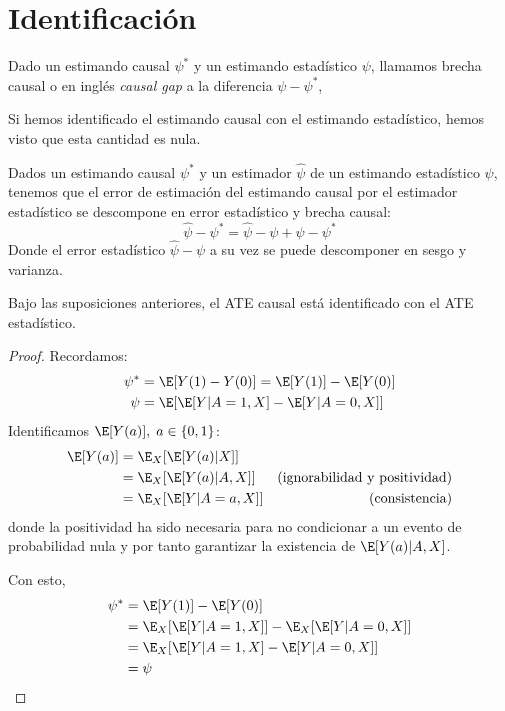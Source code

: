\section{Identificación}

\begin{definicion}\cite[sección 2.3]{mci}
	Dado un estimando causal $\psi^*$ y un estimando estadístico $\psi$, llamamos brecha causal o en inglés \textit{causal gap} a la diferencia $\psi - \psi^*$,

	Si hemos identificado el estimando causal con el estimando estadístico, hemos visto
	que esta cantidad es nula.
\end{definicion}

\begin{corolario}
	Dados un estimando causal $\psi^*$ y un estimador $\hat\psi$ de un estimando estadístico $\psi$, tenemos
	que el error de estimación del estimando causal por el estimador estadístico se descompone en
	error estadístico y brecha causal:
	$$
		\hat{\psi} - \psi^* = \hat \psi - \psi + \psi - \psi^*
	$$
	Donde el error estadístico $\hat \psi - \psi$ a su vez se puede descomponer en sesgo y varianza.
\end{corolario}

\begin{proposicion}
	Bajo las suposiciones anteriores, el ATE causal está identificado con el ATE estadístico.
\end{proposicion}

\begin{proof}\cite[sección 2.2]{mci}
	Recordamos:
	\begin{align*}
		\psi^* & = \E[Y(1) - Y(0)] = \E[Y(1)] - \E[Y(0)]    \\
		\psi   & = \E[ \E[Y | A = 1, X] - \E[Y | A = 0, X]]
	\end{align*}
	Identificamos $\E[Y(a)], \; a \in \{0, 1\}$:
	\begin{align*}
		\E[Y(a)] & = \E_X[\E[Y(a) | X]]     &                                      \\
		         & = \E_X[\E[Y(a) | A, X]]  & \text{(ignorabilidad y positividad)} \\
		         & = \E_X[\E[Y | A = a, X]] & \text{(consistencia)}                \\
	\end{align*}
	donde la positividad ha sido necesaria para no condicionar a un evento de probabilidad nula
	y por tanto garantizar la existencia de $\E[Y(a) | A, X]$.

	Con esto,
	\begin{align*}
		\psi^* & = \E[Y(1)] - \E[Y(0)]                             \\
		       & = \E_X[\E[Y | A = 1, X]] - \E_X[\E[Y | A = 0, X]] \\
		       & = \E_X[\E[Y | A = 1, X] - \E[Y | A = 0, X]]       \\
		       & = \psi
	\end{align*}
\end{proof}

